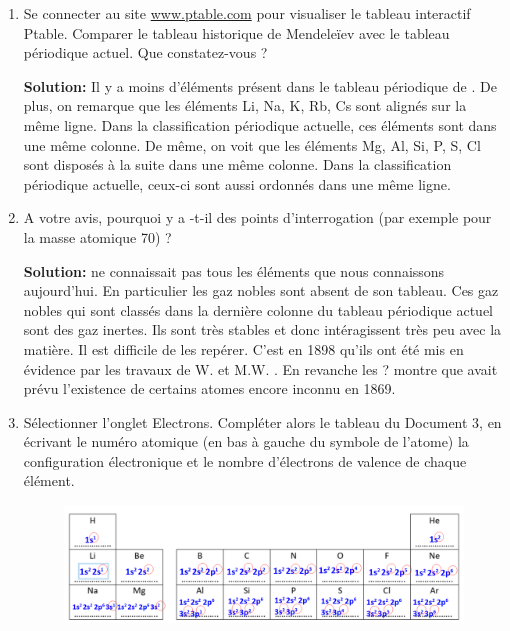 \documentclass[french]{article}
\begin{document}
\begin{enumerate}
	\item Se connecter au site \url{www.ptable.com} pour visualiser le tableau interactif Ptable. Comparer le tableau historique de Mendeleïev avec le tableau périodique actuel. Que constatez-vous ? 
	
	\textbf{Solution:} Il y a moins d'éléments présent dans le tableau périodique de . De plus, on remarque que les éléments Li, Na, K, Rb, Cs sont alignés sur la même ligne. Dans la classification périodique actuelle, ces éléments sont dans une même colonne.
	De même, on voit que les éléments Mg, Al, Si, P, S, Cl sont disposés à la suite dans une même colonne. Dans la classification périodique actuelle, ceux-ci sont aussi ordonnés dans une même ligne.

	\item A votre avis, pourquoi y a -t-il des points d'interrogation (par exemple pour la masse atomique 70) ?
	
	\textbf{Solution:}  ne connaissait pas tous les éléments que nous connaissons aujourd'hui. En particulier les gaz nobles sont absent de son tableau. Ces gaz nobles qui sont classés dans la dernière colonne du tableau périodique actuel sont des gaz inertes. Ils sont très stables et donc intéragissent très peu avec la matière. Il est difficile de les repérer. C'est en 1898 qu'ils ont été mis en évidence par les travaux de W.  et M.W. . En revanche les \og{}?\fg{} montre que  avait prévu l'existence de certains atomes encore inconnu en 1869.

	\item Sélectionner l'onglet \og{}Electrons\fg{}. Compléter alors le tableau du Document 3, en écrivant le numéro atomique (en bas à gauche  du symbole de l'atome)  la configuration électronique et le nombre d'électrons de valence de chaque élément.
	
		\begin{figure}[ht]
		\centering
		\includegraphics[width=1\textwidth]{correction.png}
	\end{figure}
	

\end{enumerate}
\end{document}
